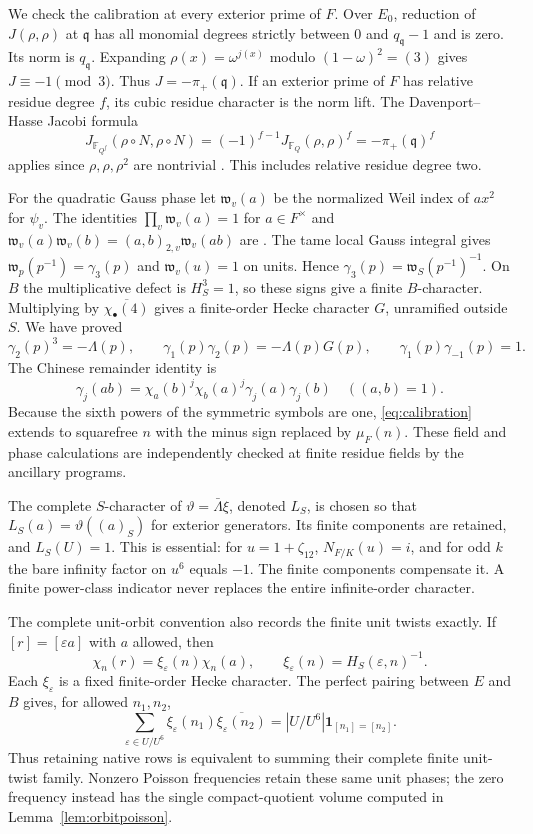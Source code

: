 \documentclass[11pt,a4paper]{article}
\numberwithin{equation}{section}
\theoremstyle{definition}
\theoremstyle{remark}
\newcommand{\ind}{\mathbf1}
\begin{document}
We check the calibration at every exterior prime of $F$. Over $E_0$, reduction of $J(\rho,\rho)$ at $\mathfrak q$ has all monomial degrees strictly between $0$ and $q_{\mathfrak q}-1$ and is zero. Its norm is $q_{\mathfrak q}$. Expanding $\rho(x)=\omega^{j(x)}$ modulo $(1-\omega)^2=(3)$ gives $J\equiv-1\pmod3$. Thus $J=-\pi_+(\mathfrak q)$. If an exterior prime of $F$ has relative residue degree $f$, its cubic residue character is the norm lift. The Davenport--Hasse Jacobi formula
\[
 J_{\mathbb F_{Q^f}}(\rho\circ N,\rho\circ N)
   =(-1)^{f-1}J_{\mathbb F_Q}(\rho,\rho)^f
   =-\pi_+(\mathfrak q)^f
\]
applies since $\rho,\rho,\rho^2$ are nontrivial \cite[Theorem 1.1]{HoshiKanai}. This includes relative residue degree two.

For the quadratic Gauss phase let $\mathfrak w_v(a)$ be the normalized Weil index of $ax^2$ for $\psi_v$. The identities
$\prod_v\mathfrak w_v(a)=1$ for $a\in F^\times$ and
$\mathfrak w_v(a)\mathfrak w_v(b)=(a,b)_{2,v}\mathfrak w_v(ab)$
are \cite[Chapter II, Sections 28--30]{Weil}. The tame local Gauss integral gives $\mathfrak w_p(p^{-1})=\gamma_3(p)$ and $\mathfrak w_v(u)=1$ on units. Hence
$\gamma_3(p)=\mathfrak w_S(p^{-1})^{-1}$. On $B$ the multiplicative defect is $H_S^3=1$, so these signs give a finite $B$-character. Multiplying by $\overline{\chi_\bullet(4)}$ gives a finite-order Hecke character $G$, unramified outside $S$. We have proved
\begin{equation}\label{eq:calibration}
 \gamma_2(p)^3=-\Lambda(p),\qquad
 \gamma_1(p)\gamma_2(p)=-\Lambda(p)G(p),\qquad
 \gamma_1(p)\gamma_{-1}(p)=1.
\end{equation}
The Chinese remainder identity is
\[
 \gamma_j(ab)=\chi_a(b)^j\chi_b(a)^j\gamma_j(a)\gamma_j(b)
 \quad((a,b)=1).
\]
Because the sixth powers of the symmetric symbols are one, \eqref{eq:calibration} extends to squarefree $n$ with the minus sign replaced by $\mu_F(n)$. These field and phase calculations are independently checked at finite residue fields by the ancillary programs.

The complete $S$-character of $\vartheta=\bar\Lambda\xi$, denoted $L_S$, is chosen so that $L_S(a)=\vartheta((a)_S)$ for exterior generators. Its finite components are retained, and $L_S(U)=1$. This is essential: for $u=1+\zeta_{12}$, $N_{F/K}(u)=i$, and for odd $k$ the bare infinity factor on $u^6$ equals $-1$. The finite components compensate it. A finite power-class indicator never replaces the entire infinite-order character.

The complete unit-orbit convention also records the finite unit twists exactly. If $[r]=[\varepsilon a]$ with $a$ allowed, then
\[
 \chi_n(r)=\xi_\varepsilon(n)\chi_n(a),\qquad
 \xi_\varepsilon(n)=H_S(\varepsilon,n)^{-1}.
\]
Each $\xi_\varepsilon$ is a fixed finite-order Hecke character. The perfect pairing between $E$ and $B$ gives, for allowed $n_1,n_2$,
\[
 \sum_{\varepsilon\in U/U^6}
 \xi_\varepsilon(n_1)\overline{\xi_\varepsilon(n_2)}
 =|U/U^6|\ind_{[n_1]=[n_2]}.
\]
Thus retaining native rows is equivalent to summing their complete finite unit-twist family. Nonzero Poisson frequencies retain these same unit phases; the zero frequency instead has the single compact-quotient volume computed in Lemma~\ref{lem:orbitpoisson}.
\end{document}
